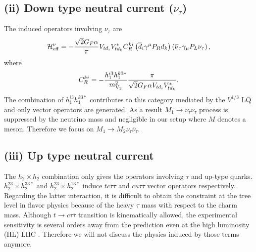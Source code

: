 \documentclass[12pt, a4paper]{article}
\numberwithin{equation}{section} %
\newcommand{\ov}{\overline}
\newcommand{\1}{\mbox{1}\hspace{-0.25em}\mbox{l}}
\begin{document}
\subsection*{(ii) Down type neutral current ($\nu_\tau$)}
The induced operators involving $\nu_\tau$ are
\begin{align}
\mathcal{H}_{\rm eff}^{\nu} = - \frac{ \sqrt{2} G_F \alpha}{\pi} V_{t d_i} V^*_{td_k} C_R^{ki} \left( \ov{d}_i \gamma^\mu P_R d_k\right) \left( \ov\nu_\tau \gamma_\mu P_L \nu_\tau \right),
\end{align}
where 
\begin{align}
    C_{R}^{ki}=-\frac{h_1^{i3} h_1^{k3*}}{m_{\rm{V}_2}^2}\frac{\pi}{ \sqrt{2} G_F \alpha V_{td_i} V^*_{td_k}}.
\end{align}
The combination of $h_1^{i3}h_1^{k3*}$ contributes to this category mediated by the $V^{1/3}$ LQ and only vector operators are generated. 
As a result $M_1\to \nu_\tau\ov\nu_\tau$ process is suppressed by the neutrino mass and negligible in our setup where $M$ denotes a meson.
Therefore we focus on $M_1\to M_2 \nu_\tau \ov\nu_\tau$.


\subsection*{ (iii) Up type neutral current}
The $h_2 \times h_2$ combination only gives the operators involving $\tau$ and up-type quarks.
$h_2^{23}\times h_2^{33*}$ and $h_2^{23}\times h_2^{13*}$ induce $t \ov c \tau\ov\tau$ and $cu \tau\ov\tau$ vector operators respectively.
Regarding the latter interaction, it is difficult to obtain the constraint at the tree level in flavor physics because of the heavy $\tau$ mass with respect to the charm mass.
Although $t \to c \tau\ov\tau$ transition is kinematically allowed, the experimental sensitivity is several orders away from the prediction even at the high luminosity (HL) LHC \cite{Kim:2018oih}.
Therefore we will not discuss the physics induced by those terms anymore.


\end{document}
